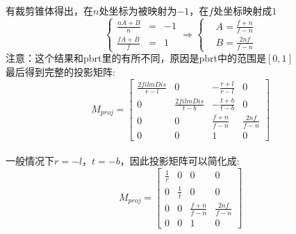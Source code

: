 有裁剪锥体得出，在$n$处坐标为被映射为$-1$，在$f$处坐标映射成$1$
\begin{displaymath}
\left\{
\begin{aligned}{}
\frac{nA + B}{n} & = & -1\\
\frac{fA + B}{f} & = & 1
\end{aligned}
\right.
\Rightarrow
\left\{
\begin{aligned}
&A = \frac{f + n}{f - n}\\
&B = \frac{2nf}{f - n}
\end{aligned}
\right.
\end{displaymath}
注意：这个结果和pbrt里的有所不同，原因是pbrt中的范围是$[0,1]$
\\

最后得到完整的投影矩阵:
\begin{displaymath}
M_{proj} = 
\begin{bmatrix}
\frac{2filmDis}{r - l} & 0 & -\frac{r + l}{r - l} & 0\\
0 & \frac{2filmDis}{t - b} & -\frac{t + b}{t - b} & 0\\
0 & 0 & \frac{f + n}{f - n} & \frac{2nf}{f - n}\\
0 & 0 & 1 & 0
\end{bmatrix}
\end{displaymath}
\\

一般情况下$r = -l$，$t = -b$，因此投影矩阵可以简化成:
\begin{displaymath}
M_{proj} = 
\begin{bmatrix}
\frac{1}{r} & 0 & 0 & 0\\
0 & \frac{1}{t} & 0 & 0\\
0 & 0 & \frac{f + n}{f - n} & \frac{2nf}{f - n}\\
0 & 0 & 1 & 0
\end{bmatrix}
\end{displaymath}